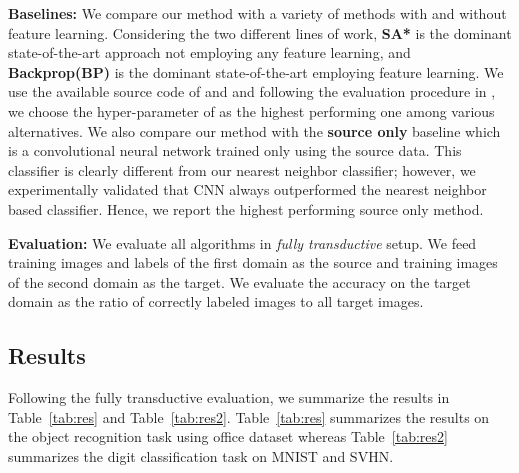 \vspace{2mm}
\noindent \textbf{Baselines:} We compare our method with a variety of methods with and without feature learning. Considering the two different lines of work, \textbf{SA*}\cite{fernando13} is the dominant state-of-the-art approach not employing any feature learning, and \textbf{Backprop(BP)}\cite{ganin15} is the dominant state-of-the-art employing feature learning. We use the available source code of \cite{ganin15} and \cite{fernando13} and following the evaluation procedure in \cite{ganin15}, we choose the hyper-parameter of \cite{fernando13} as the highest performing one among various alternatives. We also compare our method with the \textbf{source only} baseline which is a convolutional neural network trained only using the source data. This classifier is clearly different from our nearest neighbor classifier; however, we experimentally validated that CNN always outperformed the nearest neighbor based classifier. Hence, we report the highest performing source only method.

\vspace{2mm}
\noindent \textbf{Evaluation:} We evaluate all algorithms in \emph{fully transductive} setup.  We feed training images and labels of the first domain as the source and training images of the second domain as the target. We evaluate the accuracy on the target domain as the ratio of correctly labeled images to all target images.



\subsection{Results}
Following the fully transductive evaluation, we summarize the results in Table~\ref{tab:res} and Table~\ref{tab:res2}. Table~\ref{tab:res} summarizes the results on the object recognition task using office dataset whereas  Table~\ref{tab:res2} summarizes the digit classification task on MNIST and SVHN.


